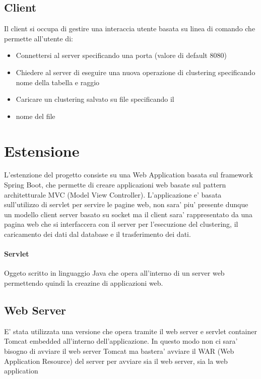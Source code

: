 \documentclass{article}
\begin{document}
        \subsection{Client}
        Il client si occupa di gestire una interaccia utente basata su linea di 
        comando che permette all'utente di:
            \begin{itemize}
                \item Connettersi al server specificando una porta (valore di 
                default 8080)
                \item Chiedere al server di eseguire una nuova operazione di
                clustering specificando nome della tabella e raggio
                \item Caricare un clustering salvato su file specificando il
                \item nome del file
            \end{itemize}


    \section{Estensione}
    L'estenzione del progetto consiste su una Web Application basata sul
    framework Spring Boot, che permette di creare applicazioni web basate sul
    pattern architetturale MVC (Model View Controller). 
    L'applicazione e' basata sull'utilizzo di servlet per servire le pagine web,
    non sara' piu' presente dunque un modello client server basato su socket ma 
    il client sara' rappresentato da una pagina web che si interfaccera con il
    server per l'esecuzione del clustering, il caricamento dei dati dal database 
    e il trasferimento dei dati.

        \paragraph{Servlet}
        Oggeto scritto in linguaggio Java che opera all'interno di
        un server web permettendo quindi la creazine di applicazioni web.
    
        \subsection{Web Server}
        E' stata utilizzata una versione che opera tramite il web server e 
        servlet container Tomcat embedded all'interno dell'applicazione. 
        In questo modo non ci sara' bisogno di avviare il web server Tomcat ma 
        bastera' avviare il WAR (Web Application Resource) del server per 
        avviare sia il web server, sia la web application
\end{document}
